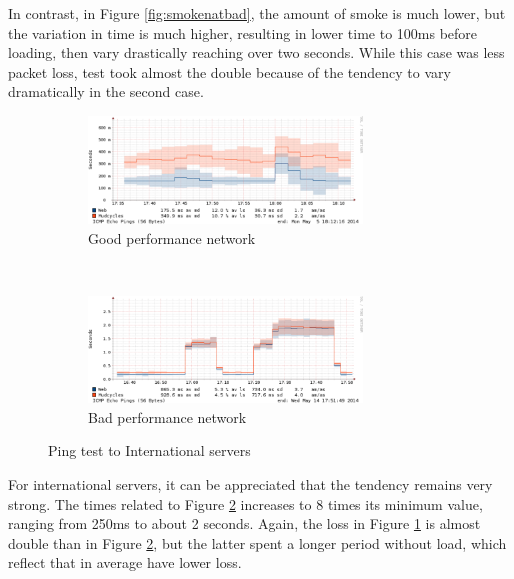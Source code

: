In contrast, in Figure \ref{fig:smokenatbad}, the amount of smoke is much
lower, but the variation in time is much higher, resulting in lower time to
100ms before loading, then vary drastically reaching over two seconds. While
this case was less packet loss, test took almost the double because of the
tendency to vary dramatically in the second case.


\begin{figure}
\begin{subfigure}{\textwidth}
\centering
    \includegraphics[width=0.8\textwidth]{img/smoke_int_good}
\caption[Smokeping: Ping test to International Servers with good performance]{Good performance network}
\label{fig:smokeintgood}
\end{subfigure}%
\\
\begin{subfigure}{\textwidth}
\centering
    \includegraphics[width=0.8\textwidth]{img/smoke_int_bad}
\caption[Smokeping: Ping test to International servers with bad performance]{Bad performance network}
\label{fig:smokeintbad}
\end{subfigure}
\caption[Smokeping: Ping test to International servers]{Ping test to International servers}
\label{fig:smokeint}
\end{figure}

For international servers, it can be appreciated that the tendency remains
very strong. The times related to Figure \ref{fig:smokeintbad} increases to 8
times its minimum value, ranging from 250ms to about 2 seconds. Again, the
loss in Figure \ref{fig:smokeintgood} is almost double than in Figure
\ref{fig:smokeintbad}, but the latter spent a longer period without load,
which reflect that in average have lower loss.

